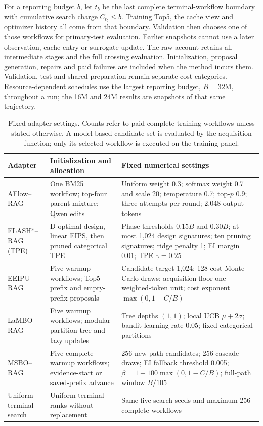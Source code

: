 For a reporting budget $b$, let $t_b$ be the last complete terminal-workflow
boundary with cumulative search charge $C_{t_b}\leq b$. Training Top5,
the cache view and optimizer history all come from that boundary. Validation
then chooses one of those workflows for primary-test evaluation. Earlier
snapshots cannot use a later observation, cache entry or surrogate update.
The raw account retains all intermediate stages and the full crossing
evaluation. Initialization, proposal generation, repairs and paid failures
are included when the method incurs them. Validation, test and shared
preparation remain separate cost categories. Resource-dependent schedules
use the largest reporting budget, $B=32\mathrm{M}$, throughout a run; the
16M and 24M results are snapshots of that same trajectory.

\begin{table}[t]
\centering\small
\caption{Fixed adapter settings. Counts refer to paid complete training
workflows unless stated otherwise. A model-based candidate set is evaluated
by the acquisition function; only its selected workflow is executed on the
training panel.}
\label{tab:rag-adapter-settings}
\begin{tabularx}{\textwidth}{@{}lXX@{}}
\toprule
Adapter & Initialization and allocation & Fixed numerical settings\\
\midrule
AFlow--RAG & One BM25 workflow; top-four parent mixture; Qwen edits
& Uniform weight 0.3; softmax weight 0.7 and scale 20; temperature 0.7;
top-$p$ 0.9; three attempts per round; 2,048 output tokens\\
FLASH*--RAG (TPE) & D-optimal design, linear EIPS, then pruned categorical TPE
& Phase thresholds $0.15B$ and $0.30B$; at most 1,024 design signatures;
ten pruning signatures; ridge penalty 1; EI margin 0.01; TPE $\gamma=0.25$\\
EEIPU--RAG & Five warmup workflows; Top5-prefix and empty-prefix proposals
& Candidate target 1,024; 128 cost Monte Carlo draws; acquisition floor
one weighted-token unit; cost exponent $\max(0,1-C/B)$\\
LaMBO--RAG & Five warmup workflows; modular partition tree and lazy updates
& Tree depths $(1,1)$; local UCB $\mu+2\sigma$;
bandit learning rate 0.05; fixed categorical partitions\\
MSBO--RAG & Five complete warmup workflows; evidence-start or saved-prefix advance
& 256 new-path candidates; 256 cascade draws; EI fallback threshold 0.005;
$\beta=1+100\max(0,1-C/B)$; full-path window $B/105$\\
Uniform-terminal search & Uniform terminal ranks without replacement
& Same five search seeds and maximum 256 complete workflows\\
\bottomrule
\end{tabularx}
\end{table}

